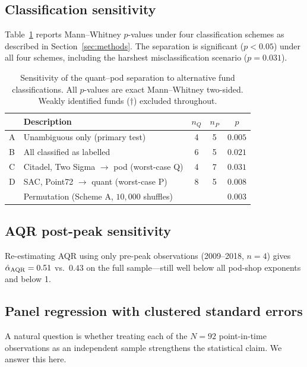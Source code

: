 \documentclass[10pt,onecolumn]{article}
\newcommand{\alphahat}{\hat{\alpha}}
\begin{document}
\subsection{Classification sensitivity}

Table~\ref{tab:robust} reports Mann--Whitney $p$-values under
four classification schemes as described in
Section~\ref{sec:methods}.
The separation is significant ($p < 0.05$) under all four schemes,
including the harshest misclassification scenario ($p = 0.031$).

\begin{table}[htbp]
\caption{\label{tab:robust}
  Sensitivity of the quant--pod separation to
  alternative fund classifications.
  All $p$-values are exact Mann--Whitney two-sided.
  Weakly identified funds ($\dagger$) excluded throughout.
}
\setlength{\tabcolsep}{5pt}
\small
\begin{tabular}{@{}llccc@{}}
  \toprule
  & Description & $n_Q$ & $n_P$ & $p$ \\
  \midrule
  A & Unambiguous only (primary test) & 4 & 5 & $0.005$ \\
  B & All classified as labelled       & 6 & 5 & $0.021$ \\
  C & Citadel, Two Sigma $\to$ pod (worst-case Q) & 4 & 7 & $0.031$ \\
  D & SAC, Point72 $\to$ quant (worst-case P)      & 8 & 5 & $0.008$ \\
  \midrule
  & Permutation (Scheme A, $10{,}000$ shuffles) & & & $0.003$ \\
  \bottomrule
\end{tabular}
\end{table}

\subsection{AQR post-peak sensitivity}

Re-estimating AQR using only pre-peak observations (2009--2018,
$n{=}4$) gives $\alphahat_{\rm AQR} = 0.51$ vs.\ $0.43$ on
the full sample---still well below all pod-shop exponents and
below 1.

\subsection{Panel regression with clustered standard errors}
\label{sec:panel}

A natural question is whether treating each of the $N{=}92$
point-in-time observations as an independent sample strengthens
the statistical claim.
We answer this here.
\end{document}
